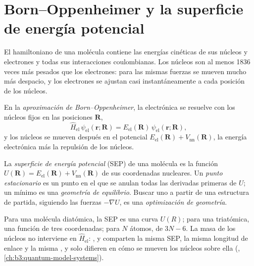 \section{Born--Oppenheimer y la superficie de energía potencial}

El hamiltoniano de una molécula contiene las energías cinéticas de sus núcleos y
electrones y todas sus interacciones coulombianas. Los núcleos son al menos 1836
veces más pesados que los electrones: para las mismas fuerzas se mueven mucho más
despacio, y los electrones se ajustan casi instantáneamente a cada posición de los
núcleos.

\begin{definition}\label{def:b3:computational-chemistry:born-oppenheimer}
En la \emph{aproximación de Born--Oppenheimer},
la  electrónica se resuelve con los núcleos
fijos en las posiciones $\mathbf R$,
\[
\hat H_{\mathrm{el}}\,\psi_{\mathrm{el}}(\mathbf r;\mathbf R) =
E_{\mathrm{el}}(\mathbf R)\,\psi_{\mathrm{el}}(\mathbf r;\mathbf R),
\]
y los núcleos se mueven después en el potencial $E_{\mathrm{el}}(\mathbf R) +
V_{\mathrm{nn}}(\mathbf R)$, la energía electrónica más la repulsión de los
núcleos.
\end{definition}

\begin{definition}\label{def:b3:computational-chemistry:pes}
La \emph{superficie de energía potencial} (SEP) de
una molécula es la función $U(\mathbf R) = E_{\mathrm{el}}(\mathbf R) +
V_{\mathrm{nn}}(\mathbf R)$ de sus coordenadas nucleares. Un \emph{punto
estacionario} es un punto en el que se anulan todas las derivadas
primeras de $U$; un mínimo es una \emph{geometría de equilibrio}.
Buscar uno a partir de una estructura de partida, siguiendo las
fuerzas $-\nabla U$, es una \emph{optimización de geometría}.
\end{definition}

Para una molécula diatómica, la SEP es una curva $U(R)$; para una triatómica, una
función de tres coordenadas; para $N$ átomos, de $3N - 6$. La masa de los
núcleos no interviene en $\hat H_{\mathrm{el}}$: ,  y  comparten la
misma SEP, la misma longitud de enlace y la misma , y solo difieren en cómo
se mueven los núcleos sobre ella (, \cref{ch:b3:quantum-model-systems}).

